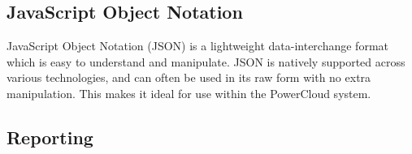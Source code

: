 \documentclass{article}
\begin{document}
	\subsection{JavaScript Object Notation}
	
	JavaScript Object Notation (JSON) is a lightweight data-interchange format which is easy to understand and manipulate. JSON is natively supported across various technologies, and can often be used in its raw form with no extra manipulation. This makes it ideal for use within the PowerCloud system.
	
	\subsection{Reporting}
\end{document}
